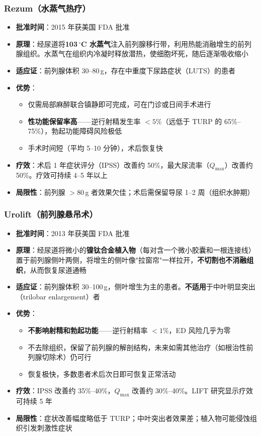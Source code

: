 \subsubsection{Rezum（水蒸气热疗）}

\begin{itemize}[leftmargin=2cm]
	\item \textbf{批准时间}：2015 年获美国 FDA 批准
	\item \textbf{原理}：经尿道将\textbf{103\,$^\circ$C 水蒸气}注入前列腺移行带，利用热能消融增生的前列腺组织。水蒸气在组织内冷凝时释放潜热，使细胞坏死，随后逐渐吸收缩小
	\item \textbf{适应证}：前列腺体积 30--80\,g，存在中重度下尿路症状（LUTS）的患者
	\item \textbf{优势}：
	\begin{itemize}
		\item 仅需局部麻醉联合镇静即可完成，可在门诊或日间手术进行
		\item \textbf{性功能保留率高}——逆行射精发生率 $<5\%$（远低于 TURP 的 65\%--75\%），勃起功能障碍风险极低
		\item 手术时间短（平均 5--10 分钟），术后恢复快
	\end{itemize}
	\item \textbf{疗效}：术后 1 年症状评分（IPSS）改善约 50\%，最大尿流率（$Q_{\max}$）改善约 50\%。疗效可持续 4--5 年以上
	\item \textbf{局限性}：前列腺 $>80$\,g 者效果欠佳；术后需保留导尿 1--2 周（组织水肿期）
\end{itemize}

\subsubsection{Urolift（前列腺悬吊术）}

\begin{itemize}[leftmargin=2cm]
	\item \textbf{批准时间}：2013 年获美国 FDA 批准
	\item \textbf{原理}：经尿道将微小的\textbf{镍钛合金植入物}（每对含一个微小胶囊和一根连接线）置于前列腺侧叶两侧，将增生的侧叶像"拉窗帘"一样拉开，\textbf{不切割也不消融组织}，从而恢复尿道通畅
	\item \textbf{适应证}：前列腺体积 30--100\,g，侧叶增生为主的患者。\textbf{不适用}于中叶明显突出（trilobar enlargement）者
	\item \textbf{优势}：
	\begin{itemize}
		\item \textbf{不影响射精和勃起功能}——逆行射精率 $<1\%$，ED 风险几乎为零
		\item 不去除组织，保留了前列腺的解剖结构，未来如需其他治疗（如根治性前列腺切除术）仍可行
		\item 恢复极快，多数患者术后次日即可恢复正常活动
	\end{itemize}
	\item \textbf{疗效}：IPSS 改善约 35\%--40\%，$Q_{\max}$ 改善约 30\%--40\%。LIFT 研究显示疗效可持续 5 年
	\item \textbf{局限性}：症状改善幅度略低于 TURP；中叶突出者效果差；植入物可能侵蚀组织引发刺激性症状
\end{itemize}

